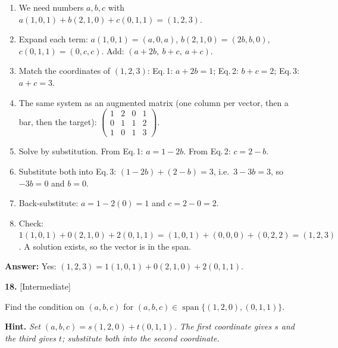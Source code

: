 \documentclass[11pt]{article}
\begin{document}
\begin{tcolorbox}[breakable,colback=ans,colframe=ansb,boxrule=0.5pt,left=4pt,right=4pt,top=2pt,bottom=2pt]\begin{enumerate}[leftmargin=2.2em,itemsep=1pt,topsep=1pt,label=\textbf{Step \arabic*.}]\item We need numbers $a,b,c$ with $a(1,0,1)+b(2,1,0)+c(0,1,1)=(1,2,3)$.
\item Expand each term: $a(1,0,1)=(a,0,a)$, $b(2,1,0)=(2b,b,0)$, $c(0,1,1)=(0,c,c)$. Add: $(a+2b,\ b+c,\ a+c)$.
\item Match the coordinates of $(1,2,3)$: Eq.\,1: $a+2b=1$; Eq.\,2: $b+c=2$; Eq.\,3: $a+c=3$.
\item The same system as an augmented matrix (one column per vector, then a bar, then the target): $\left(\begin{array}{ccc|c}1&2&0&1\\0&1&1&2\\1&0&1&3\end{array}\right)$.
\item Solve by substitution. From Eq.\,1: $a=1-2b$. From Eq.\,2: $c=2-b$.
\item Substitute both into Eq.\,3: $(1-2b)+(2-b)=3$, i.e.\ $3-3b=3$, so $-3b=0$ and $b=0$.
\item Back-substitute: $a=1-2(0)=1$ and $c=2-0=2$.
\item Check: $1(1,0,1)+0(2,1,0)+2(0,1,1)=(1,0,1)+(0,0,0)+(0,2,2)=(1,2,3)$ \checkmark. A solution exists, so the vector is in the span.
\end{enumerate}\textbf{Answer:} Yes: $(1,2,3)=1(1,0,1)+0(2,1,0)+2(0,1,1)$.\end{tcolorbox}
\par\vspace{2pt}
\begin{minipage}{\linewidth}\textbf{18.} \hfill{\scriptsize\color{ink}[Intermediate]}\par\nopagebreak Find the condition on $(a,b,c)$ for $(a,b,c)\in\operatorname{span}\{(1,2,0),(0,1,1)\}$.
\par\smallskip\begingroup\small\color{ink}\textbf{Hint.} \textit{Set $(a,b,c)=s(1,2,0)+t(0,1,1)$. The first coordinate gives $s$ and the third gives $t$; substitute both into the second coordinate.}\endgroup
\end{minipage}\par\nopagebreak
\end{document}
